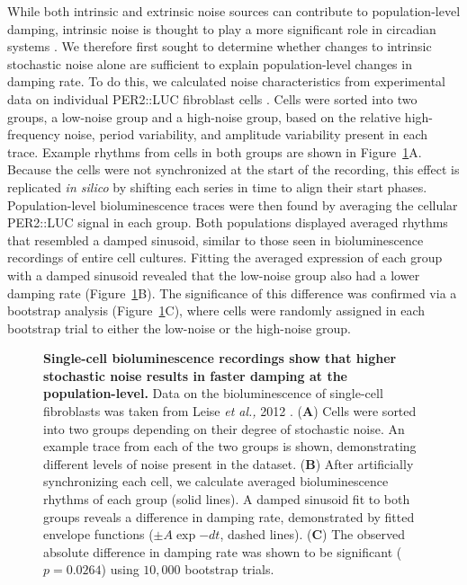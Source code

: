 \documentclass[11pt, letterpaper]{article}
\begin{document}
While both intrinsic and extrinsic noise sources can contribute to population-level damping, intrinsic noise is thought to play a more significant role in circadian systems \cite{Herzog2004}.
We therefore first sought to determine whether changes to intrinsic stochastic noise alone are sufficient to explain population-level changes in damping rate.
To do this, we calculated noise characteristics from experimental data on individual PER2::LUC fibroblast cells \cite{Leise2012}.
Cells were sorted into two groups, a low-noise group and a high-noise group, based on the relative high-frequency noise, period variability, and amplitude variability present in each trace.
Example rhythms from cells in both groups are shown in Figure~\ref{fig:fibroblast_noise}A.
Because the cells were not synchronized at the start of the recording, this effect is replicated {\itshape in silico} by shifting each series in time to align their start phases.
Population-level bioluminescence traces were then found by averaging the cellular PER2::LUC signal in each group.
Both populations displayed averaged rhythms that resembled a damped sinusoid, similar to those seen in bioluminescence recordings of entire cell cultures.
Fitting the averaged expression of each group with a damped sinusoid revealed that the low-noise group also had a lower damping rate (Figure~\ref{fig:fibroblast_noise}B).
The significance of this difference was confirmed via a bootstrap analysis (Figure~\ref{fig:fibroblast_noise}C), where cells were randomly assigned in each bootstrap trial to either the low-noise or the high-noise group.

\begin{figure}[tbp]
  \begin{center}
  \end{center}
  \caption{{\bfseries Single-cell bioluminescence recordings show that higher stochastic noise results in faster damping at the population-level.}
  Data on the bioluminescence of single-cell fibroblasts was taken from Leise {\itshape et al.,} 2012 \cite{Leise2012}.
({\bfseries A}) Cells were sorted into two groups depending on their degree of stochastic noise. An example trace from each of the two groups is shown, demonstrating different levels of noise present in the dataset.
({\bfseries B}) After artificially synchronizing each cell, we calculate averaged bioluminescence rhythms of each group (solid lines). A damped sinusoid fit to both groups reveals a difference in damping rate, demonstrated by fitted envelope functions ($\pm A\exp{-dt}$, dashed lines).
({\bfseries C}) The observed absolute difference in damping rate was shown to be significant ($p = 0.0264$) using $10,000$ bootstrap trials.}
\label{fig:fibroblast_noise}
\end{figure}
\end{document}
